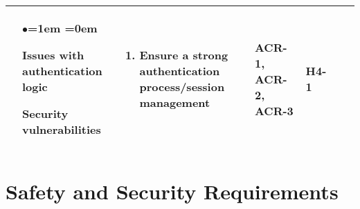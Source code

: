 \documentclass{article}
\begin{document}
\begin{table}[H]
\begin{tabularx}{\textwidth}{|P{2cm}|P{2cm}|P{2cm}|P{2cm}|P{3.45cm}|P{1cm}|P{1cm}|}
        & 
        \begin{list}{$\bullet$}{\leftmargin=1em \itemindent=0em}
            \item Issues with authentication logic
            \item Security vulnerabilities
        \end{list}
        & 
        \begin{enumerate}[label=(\alph*)]{\leftmargin=1em \itemindent=0em}
            \item Ensure a strong authentication process/session management
        \end{enumerate}
        & ACR-1, ACR-2, ACR-3 & H4-1\\
        \hline
    \end{tabularx}
\end{table}

\section{Safety and Security Requirements}
\end{document}
